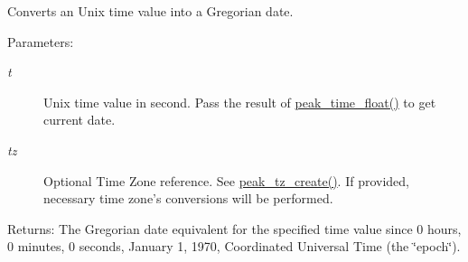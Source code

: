 Converts an Unix time value into a Gregorian date. 

\begin{Desc}
\item[Parameters:]
\begin{description}
\item[{\em t}]Unix time value in second. Pass the result of \hyperlink{group__time_ga7}{peak\_\-time\_\-float()} to get current date. \item[{\em tz}]Optional Time Zone reference. See \hyperlink{group__tz_ga12}{peak\_\-tz\_\-create()}. If provided, necessary time zone's conversions will be performed.\end{description}
\end{Desc}
\begin{Desc}
\item[Returns:]The Gregorian date equivalent for the specified time value since 0 hours, 0 minutes, 0 seconds, January 1, 1970, Coordinated Universal Time (the \char`\"{}epoch\char`\"{}). \end{Desc}
